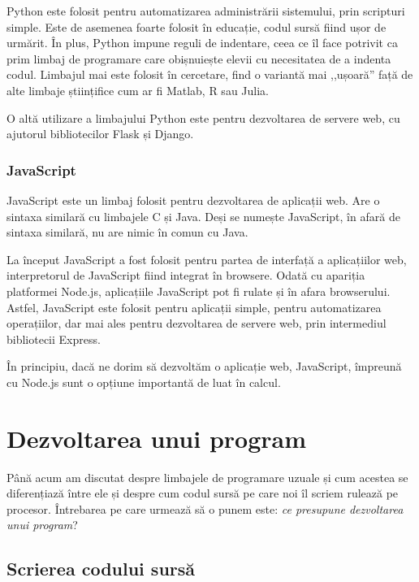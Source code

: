Python este folosit pentru automatizarea administrării sistemului, prin
scripturi simple. Este de asemenea foarte folosit în educație, codul sursă fiind
ușor de urmărit. În plus, Python impune reguli de indentare, ceea ce îl face
potrivit ca prim limbaj de programare care obișnuiește elevii cu necesitatea de
a indenta codul. Limbajul mai este folosit în cercetare, find o variantă mai
,,ușoară'' față de alte limbaje științifice cum ar fi Matlab, R sau Julia.

O altă utilizare a limbajului Python este pentru dezvoltarea de servere web, cu
ajutorul bibliotecilor Flask și Django.

\subsubsection{JavaScript}
\label{sec:appdev:hybrid-lang:js}

JavaScript este un limbaj folosit pentru dezvoltarea de aplicații web. Are o
sintaxa similară cu limbajele C și Java. Deși se numește JavaScript, în afară de
sintaxa similară, nu are nimic în comun cu Java.

La început JavaScript a fost folosit pentru partea de interfață a aplicațiilor
web, interpretorul de JavaScript fiind integrat în browsere. Odată cu apariția
platformei Node.js, aplicațiile JavaScript pot fi rulate și în afara
browserului. Astfel, JavaScript este folosit pentru aplicații simple, pentru
automatizarea operațiilor, dar mai ales pentru dezvoltarea de servere web, prin
intermediul bibliotecii Express.

În principiu, dacă ne dorim să dezvoltăm o aplicație web, JavaScript, împreună
cu Node.js sunt o opțiune importantă de luat în calcul.

\section{Dezvoltarea unui program}
\label{sec:appdev:dev}

Până acum am discutat despre limbajele de programare uzuale și cum acestea se
diferențiază între ele și despre cum codul sursă pe care noi îl scriem rulează
pe procesor. Întrebarea pe care urmează să o punem este: \textit{ce presupune
dezvoltarea unui program}?

\subsection{Scrierea codului sursă}
\label{sec:appdev:dev-stages:write}

